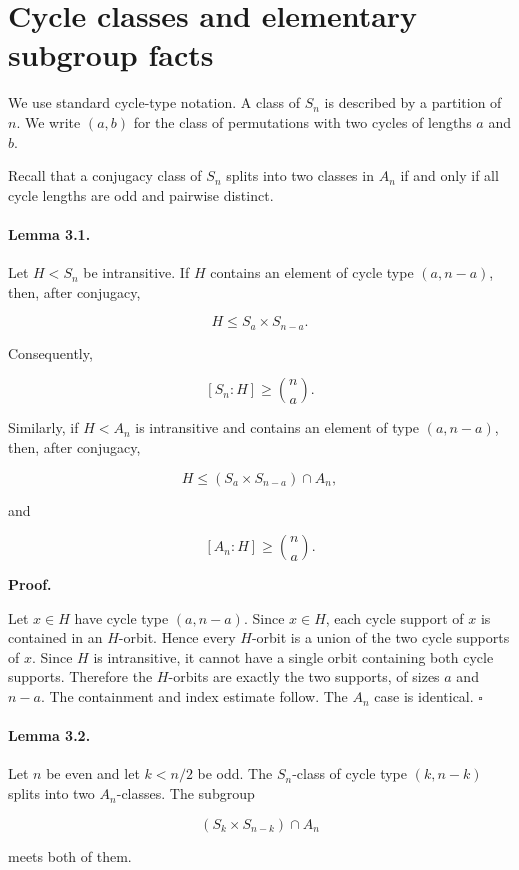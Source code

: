 \documentclass[11pt]{article}
\begin{document}
\section{Cycle classes and elementary subgroup facts}

We use standard cycle-type notation. A class of $S_n$ is described by a partition of $n$. We write $(a,b)$ for the class of permutations with two cycles of lengths $a$ and $b$.

Recall that a conjugacy class of $S_n$ splits into two classes in $A_n$ if and only if all cycle lengths are odd and pairwise distinct.

\paragraph{Lemma 3.1.}

Let $H<S_n$ be intransitive. If $H$ contains an element of cycle type $(a,n-a)$, then, after conjugacy,

\[
H\le S_a\times S_{n-a}.
\]

Consequently,

\[
[S_n:H]\ge \binom na.
\]

Similarly, if $H<A_n$ is intransitive and contains an element of type $(a,n-a)$, then, after conjugacy,

\[
H\le (S_a\times S_{n-a})\cap A_n,
\]

and

\[
[A_n:H]\ge\binom na.
\]

\noindent\textbf{Proof.}

Let $x\in H$ have cycle type $(a,n-a)$. Since $x\in H$, each cycle support of $x$ is contained in an $H$-orbit. Hence every $H$-orbit is a union of the two cycle supports of $x$. Since $H$ is intransitive, it cannot have a single orbit containing both cycle supports. Therefore the $H$-orbits are exactly the two supports, of sizes $a$ and $n-a$. The containment and index estimate follow. The $A_n$ case is identical. $\square$

\paragraph{Lemma 3.2.}

Let $n$ be even and let $k<n/2$ be odd. The $S_n$-class of cycle type $(k,n-k)$ splits into two $A_n$-classes. The subgroup

\[
(S_k\times S_{n-k})\cap A_n
\]

meets both of them.
\end{document}
